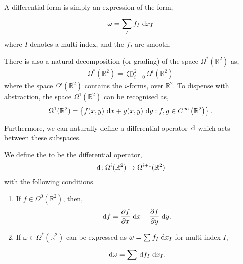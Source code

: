 \begin{remark}
	A differential form is simply an expression of the form,
	\begin{align*}
		\omega = \sum_{I}^{}{f _{I} \operatorname{\, d\!}{x_I}}
	\end{align*}
	where $ I $ denotes a multi-index, and the $ f_I $ are smooth.
\end{remark}

There is also a natural decomposition (or
grading) of the space $ \Omega
	^{*}(\mathbb{R}^{2}) $ as,
\begin{align*}
	\Omega ^{*}( \mathbb{R}^{2}) = \bigoplus_{i=0}^{2}{\Omega
	^{i}(\mathbb{R}^{2})}
\end{align*}
where the space $ \Omega^i(\mathbb{R}^{2}) $ contains the $ i $-forms, over $
	\mathbb{R}^{2} $. To dispense with abstraction, the space $
	\Omega^1(\mathbb{R}^{2}) $ can be recognised as,
\begin{align*}
	\Omega^1(\mathbb{R}^{2}) = \left\{ f(x,y)\operatorname{\, d\!}{x} + g(x,y)\operatorname{\, d\!}{y}:
	f,g \in C ^{\infty}\left( \mathbb{R}^{2} \right) \right\}.
\end{align*}

Furthermore, we can naturally define a differential operator $ \operatorname{\, d\!}{} $ which acts
between these subspaces.

\begin{definition}
	We define the  to be the differential operator,
	\begin{align*}
		\operatorname{\, d\!} : \Omega^i(\mathbb{R}^{2}) \to \Omega ^{i+1}(\mathbb{R}^{2})
	\end{align*}
	with the following conditions.
	\begin{enumerate}
		\item If $ f \in \Omega^0(\mathbb{R}^{2}) $, then,
		      \begin{align*}
			      \operatorname{\, d\!}{f} = \frac{\partial f}{\partial x}\operatorname{\, d\!}{x} + \frac{\partial f}{\partial
				      y}\operatorname{\, d\!}{y}.
		      \end{align*}
		\item If $ \omega \in \Omega ^{*}(\mathbb{R}^{2}) $ can be expressed as $
			      \omega = \sum_{}^{}{f _{I} \operatorname{\, d\!}{x_I}} $ for multi-index $ I $,
		      \begin{align*}
			      \operatorname{\, d\!}{\omega} = \sum_{}^{}{\operatorname{\, d\!}{f_I}\operatorname{\, d\!}{x_I}}.
		      \end{align*}
	\end{enumerate}
\end{definition}


